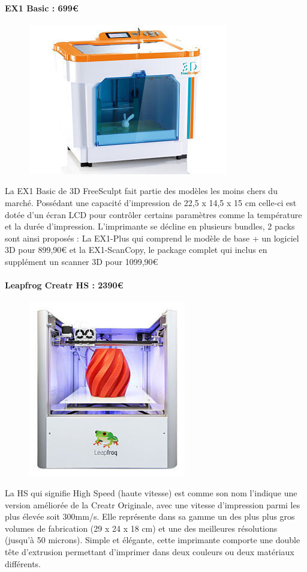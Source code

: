 \documentclass{article}
\begin{document}
\paragraph{EX1 Basic : 699\euro{}} \hfill \break
\begin{figure}[h!]
\centering
\includegraphics[scale=0.4]{./images/3d-freesculpt.png}
\end{figure}\hfill \break
La EX1 Basic de 3D FreeSculpt fait partie des modèles les moins chers du marché. Possédant une capacité d'impression de 22,5 x 14,5 x 15 cm celle-ci est dotée d'un écran LCD pour contrôler certains paramètres comme la température et la durée d'impression. L'imprimante se décline en plusieurs bundles, 2 packs sont ainsi proposés : La EX1-Plus qui comprend le modèle de base + un logiciel 3D pour 899,90\euro{} et la EX1-ScanCopy, le package complet qui inclus en supplément un scanner 3D pour 1099,90\euro{}
\paragraph{Leapfrog Creatr HS : 2390\euro{}} \hfill \break
\begin{figure}[h!]
\centering
\includegraphics[scale=0.4]{./images/Creatr.png}
\end{figure}\hfill \break
La HS qui signifie High Speed (haute vitesse) est comme son nom l'indique une version améliorée de
la Creatr Originale, avec une vitesse d'impression parmi les plus élevée soit 300mm/s. Elle représente
dans sa gamme un des plus plus gros volumes de fabrication (29 x 24 x 18 cm) et une des meilleures
résolutions (jusqu'à 50 microns). Simple et élégante, cette imprimante comporte une double tête
d'extrusion permettant d'imprimer dans deux couleurs ou deux matériaux différents.
\end{document}
